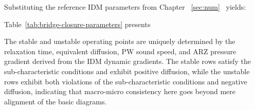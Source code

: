 \documentclass[11pt,a4paper,openany]{book}
\numberwithin{equation}{chapter}
\numberwithin{figure}{chapter}
\numberwithin{table}{chapter}
\newcommand{\tabletext}[2]{%
  \par\smallskip\noindent
  Table~\ref{#1} presents #2
\par\smallskip
}
\begin{document}
Substituting the reference IDM parameters from Chapter ~\ref{sec:num}~ yields:







\begin{center}
\label{tab:bridge-closure-parameters}
\end{center}
\tabletext{tab:bridge-closure-parameters}{




The stable and unstable operating points are uniquely determined by the relaxation time, equivalent diffusion, PW sound speed, and ARZ pressure gradient derived from the IDM dynamic gradients. The stable rows satisfy the sub-characteristic conditions and exhibit positive diffusion, while the unstable rows exhibit both violations of the sub-characteristic conditions and negative diffusion, indicating that macro-micro consistency here goes beyond mere alignment of the basic diagrams.
}
\end{document}
